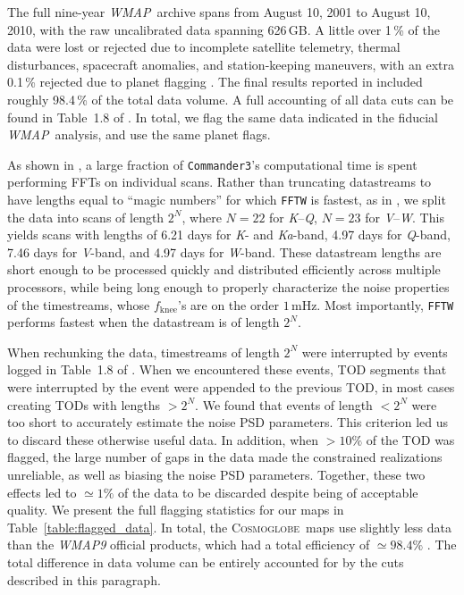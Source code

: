 \documentclass[twocolumn]{../../common/aa}
\def\WMAP{\emph{WMAP}}
\def\commanderthree{\texttt{Commander3}}
\newcommand{\Cosmoglobe}{\textsc{Cosmoglobe}}
\newcommand{\K}[0]{\textit K}
\newcommand{\Ka}[0]{\textit{Ka}}
\newcommand{\Q}[0]{\textit Q}
\newcommand{\V}[0]{\textit V}
\newcommand{\W}[0]{\textit W}
\begin{document}
The full nine-year \WMAP\ archive spans from August 10, 2001 to August 10, 2010, with the raw uncalibrated data spanning 626\,GB. A little over 1\,\% of the data were lost or rejected due to incomplete satellite telemetry, thermal disturbances, spacecraft anomalies, and station-keeping maneuvers, with an extra 0.1\,\% rejected due to planet flagging \citep{bennett2003a,hinshaw2007,hinshaw2009,bennett2012}. 
The final results reported in \citet{bennett2012} included roughly 98.4\,\% of the total data volume.
A full accounting of all data cuts can be found in Table~1.8 of \citet{wmapexsupp}. In total, we flag the same data indicated in the fiducial \WMAP\ analysis, and use the same planet flags.

As shown in \citet{bp03}, a large fraction of \commanderthree's computational time is spent performing FFTs on individual scans. Rather than truncating datastreams to have lengths equal to ``magic numbers'' for which \texttt{FFTW} \citep{FFTW05} is fastest, as in \citet{bp03}, 
we split the data into scans of length $2^N$, where $N=22$ for \K--\Q, $N=23$ for \V--\W. This yields scans with lengths of 6.21 days for \K- and \Ka-band, 4.97 days for \Q-band, 7.46 days for \V-band, and 4.97 days for \W-band.
These datastream lengths are short enough to be processed quickly and distributed efficiently across multiple processors, while being long enough to properly characterize the noise properties of the timestreams, whose $f_\mathrm{knee}$'s are on the order $1\,\mathrm{mHz}$. Most importantly, \texttt{FFTW} performs fastest when the datastream is of length $2^N$.

When rechunking the data, timestreams of length $2^N$ were interrupted by events logged in Table~1.8 of \citet{wmapexsupp}.
When we encountered these events, TOD segments that were interrupted by the event were appended to the previous TOD, in most cases creating TODs with lengths $>2^N$. We found that events of length $<2^N$ were too short to accurately estimate the noise PSD parameters. This criterion led us to discard these otherwise useful data. In addition, when $>10\%$ of the TOD was flagged, the large number of gaps in the data made the constrained realizations unreliable, as well as biasing the noise PSD parameters. Together, these two effects led to $\simeq1\%$ of the data to be discarded despite being of acceptable quality. We present the full flagging statistics for our maps in Table~\ref{table:flagged_data}. In total, the \Cosmoglobe\ maps use slightly less data than the \textit{WMAP9} official products, which had a total efficiency of $\simeq98.4\%$ \citep{bennett2012}. The total difference in data volume can be entirely accounted for by the cuts described in this paragraph.
\end{document}
